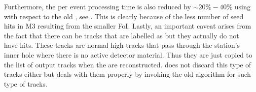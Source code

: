Furthermore, the per event processing time is also reduced by $\sim 20\% - 40 \%$ using \mvTTm
with respect to the old \mvm, see .
This is clearly because of the less number of seed hits in M3 resulting from the smaller FoI. Lastly, an important caveat arises from the fact that there can be tracks
that are labelled as \veloTTCand but they actually do not have \ttracker hits. These tracks are normal high \pt tracks that pass through the \ttracker station's inner hole
where there is no active detector material.
Thus they are just copied to the list of output tracks when the \veloTTCand are reconstructed.
\mvTTm does not discard this type of tracks either but deals with them properly
by invoking the old \mvm algorithm for such type of tracks.

